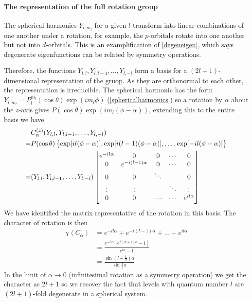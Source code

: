 \paragraph{The representation of the full rotation group}
The spherical harmonics $Y_{l,m_l}$ for a given $l$ transform into linear combinations of one another under a rotation, for example, the $p$-orbitals rotate into one another but not into $d$-orbitals. This is an examplification of \cref{degeneigen}, which says degenerate eigenfunctions can be related by symmetry operations.\par
Therefore, the functions $Y_{l,l},Y_{l,l-1},\dots,Y_{l,-l}$ form a basis for a $(2l+1)$-dimensional representation of the gruop. As they are orthonormal to each other, the representation is irreducible. The spherical harmonic has the form $Y_{l,m_l}=P_l^{m_l}(\cos\theta)\exp(im_l\phi) $ (\cref{sphericalharmonics}) so a rotation by $\alpha$ about the $z$-axis gives $P(\cos\theta)\exp(im_l(\phi-\alpha)) $, extending this to the entire basis we have
\begin{equation}
\begin{aligned}
	&C_{\alpha}^{(z)}(Y_{l,l},Y_{l,l-1},\dots,Y_{l,-l})\\
	=&P(\cos\theta)\left\{\exp[il(\phi-\alpha)],\exp[i(l-1)(\phi-\alpha)],\dots,\exp[-il(\phi-\alpha)] \right\}\\
	=&(Y_{l,l},Y_{l,l-1},\dots,Y_{l,-l})
	\begin{bmatrix}
		e^{-il\alpha} & 0 & 0 & \cdots & 0\\
		0 & e^{-i(l-1)\alpha} & 0 & \cdots & 0\\
		0 & 0 & \ddots &  & 0\\
		\vdots & \vdots &  & \ddots & \vdots \\
		0&0&\cdots&\cdots&e^{il\alpha}
	\end{bmatrix}
\end{aligned}
\end{equation}
We have identified the matrix representative of the rotation in this basis. The character of rotation is then 
\begin{equation}
\begin{aligned}
	\chi(C_{\alpha})&=e^{-il\alpha}+e^{-i(l-1)\alpha}+\dots+e^{il\alpha}\\
	&=\frac{e^{-il\alpha}[e^{i(2l+1)\alpha}-1] }{e^{i\alpha}-1}\\
	&=\frac{\sin(l+\tfrac{1}{2})\alpha}{\sin\tfrac{1}{2}\alpha}
\end{aligned}
\end{equation}
In the limit of $\alpha\rightarrow0$ (infinitesimal rotation as a symmetry operation) we get the character as $2l+1$ so we recover the fact that levels with quantum number $l$ are $(2l+1)$-fold degenerate in a spherical system.
